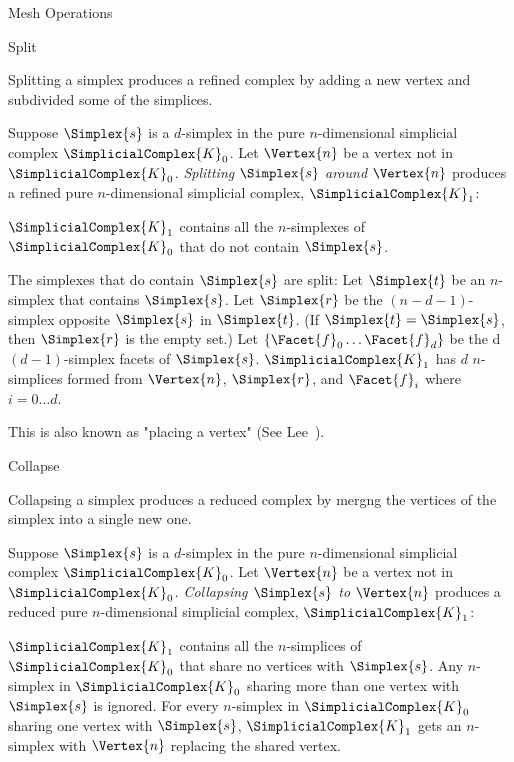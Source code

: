 \begin{plSection}{Mesh Operations}
\label{sec:mesh-operations}

\begin{plSection}{Split}

Splitting a simplex produces a refined complex by adding a new vertex
and subdivided some of the simplices.


Suppose $\Simplex{s}$ is a $d$-simplex
in the pure $n$-dimensional simplicial complex $\SimplicialComplex{K}_0$.
Let $\Vertex{n}$ be a vertex not in $\SimplicialComplex{K}_0$.
{\it Splitting $\Simplex{s}$ around $\Vertex{n}$}
produces a refined pure $n$-dimensional simplicial complex, $\SimplicialComplex{K}_1$:

$\SimplicialComplex{K}_1$ contains all the  $n$-simplexes of $\SimplicialComplex{K}_0$
that do not contain $\Simplex{s}$.

The simplexes that do contain $\Simplex{s}$ are split:
Let $\Simplex{t}$ be an $n$-simplex that contains $\Simplex{s}$.
Let $\Simplex{r}$ be the $(n-d-1)$-simplex opposite $\Simplex{s}$
in $\Simplex{t}$.
(If $\Simplex{t} = \Simplex{s}$, then $\Simplex{r}$ is the empty set.)
Let $\left\{ \Facet{f}_0 \ldots \Facet{f}_d \right\}$ be the
d $(d-1)$-simplex facets of $\Simplex{s}$.
$\SimplicialComplex{K}_1$ has
$d$ $n$-simplices formed from
$\Vertex{n}$, $\Simplex{r}$, and
$\Facet{f}_i$ where $i=0 \ldots d$.

This is also known as "placing a vertex" 
(See Lee~\cite[sec.~17.2]{Lee:2004:Subdivisions}).

\end{plSection}%

\begin{plSection}{Collapse}

Collapsing a simplex produces a reduced complex by mergng
the vertices of the simplex into a single new one.

Suppose $\Simplex{s}$ is a $d$-simplex
in the pure $n$-dimensional simplicial complex $\SimplicialComplex{K}_0$.
Let $\Vertex{n}$ be a vertex not in $\SimplicialComplex{K}_0$.
{\it Collapsing $\Simplex{s}$ to $\Vertex{n}$}
produces a reduced pure $n$-dimensional simplicial complex, $\SimplicialComplex{K}_1$:

$\SimplicialComplex{K}_1$ contains all the
$n$-simplices of $\SimplicialComplex{K}_0$ that share no vertices with $\Simplex{s}$.
Any $n$-simplex in $\SimplicialComplex{K}_0$ sharing more than one vertex
with $\Simplex{s}$ is ignored.
For every $n$-simplex in $\SimplicialComplex{K}_0$ sharing one vertex with $\Simplex{s}$,
$\SimplicialComplex{K}_1$ gets an $n$-simplex with $\Vertex{n}$ replacing the
shared vertex.

\end{plSection}%

\end{plSection}%
